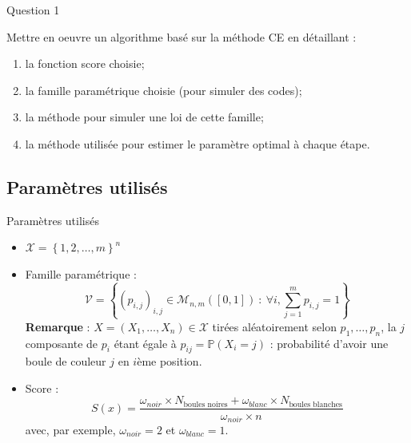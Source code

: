 \documentclass[10pt,xcolor=table,color={dvipsnames,usenames},ignorenonframetext,usepdftitle=false,french]{beamer}
\begin{document}
\begin{frame}{Question 1 \bccrayon}
\protect\hypertarget{question-1}{}

Mettre en oeuvre un algorithme basé sur la méthode CE en détaillant :

\begin{enumerate}
\item la fonction score choisie;
\item la famille paramétrique choisie (pour simuler des codes);
\item la méthode pour simuler une loi de cette famille;
\item la méthode utilisée pour estimer le paramètre \og optimal \fg{} à chaque étape.
\end{enumerate}

\end{frame}

\hypertarget{paramuxe8tres-utilisuxe9s}{%
\subsection{Paramètres utilisés}\label{paramuxe8tres-utilisuxe9s}}

\begin{frame}{Paramètres utilisés}
\protect\hypertarget{paramuxe8tres-utilisuxe9s-1}{}

\begin{itemize}

\item<1-> $\mathcal{X}=\left\{ 1,2,\dots,m\right\}^{n}$  

\item<2-> Famille paramétrique : $$\mathcal{V} = \left\{ \left(p_{i,j}\right)_{i,j} \in\mathcal{M}_{n,m}([0,1])\::\:\forall i,\sum_{j=1}^mp_{i,j}=1\right\} $$
\textbf{Remarque} : $X=(X_{1},\dots,X_{n})\in\mathcal{X}$ tirées aléatoirement selon $p_{1},\dots,p_{n}$, la $j$ \ieme{} composante de $p_{i}$ étant égale à $p_{ij}=\mathbb{P}(X_{i}=j)$ : probabilité d'avoir une boule de couleur $j$ en $i$ème position.

\item<3-> Score : 
$$
S(x)=\frac{\omega_{noir}\times N_{\text{boules noires}}+\omega_{blanc}\times N_{\text{boules blanches}}
}{
\omega_{noir}\times n
}
$$
avec, par exemple, $\omega_{noir}=2$ et $\omega_{blanc}=1$.


\end{itemize}

\end{frame}
\end{document}
